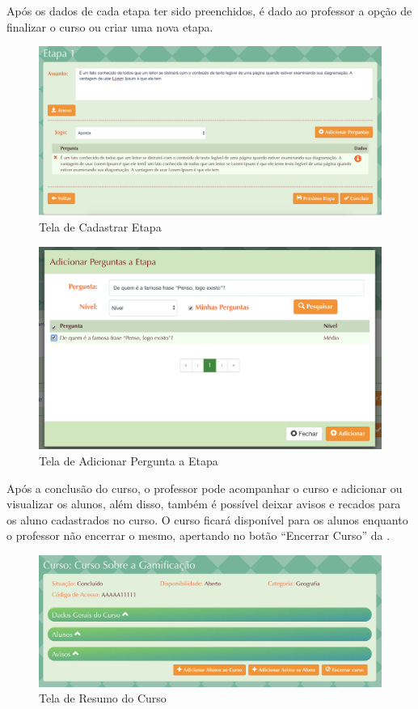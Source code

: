 Após os dados de cada etapa ter sido preenchidos, é dado ao professor a opção de finalizar o curso ou criar uma nova etapa.

\begin{figure}[H]
  \centering
  \includegraphics[scale=0.35]{images/proposta-img/Figura4-30.png}
  \caption{Tela de Cadastrar Etapa}
  \label{fig:Figura4-30}
\end{figure}

\begin{figure}[H]
  \centering
  \includegraphics[scale=0.5]{images/proposta-img/Figura4-31.png}
  \caption{Tela de Adicionar Pergunta a Etapa}
  \label{fig:Figura4-31}
\end{figure}

Após a conclusão do curso, o professor pode acompanhar o curso e adicionar  ou visualizar os alunos, além disso, também é possível deixar avisos e recados para os aluno cadastrados no curso.  O curso ficará disponível para os alunos enquanto o professor não encerrar o mesmo, apertando no botão “Encerrar Curso” da .

\begin{figure}[H]
  \centering
  \includegraphics[scale=0.45]{images/proposta-img/Figura4-32.png}
  \caption{Tela de Resumo do Curso}
  \label{fig:Figura4-32}
\end{figure}

